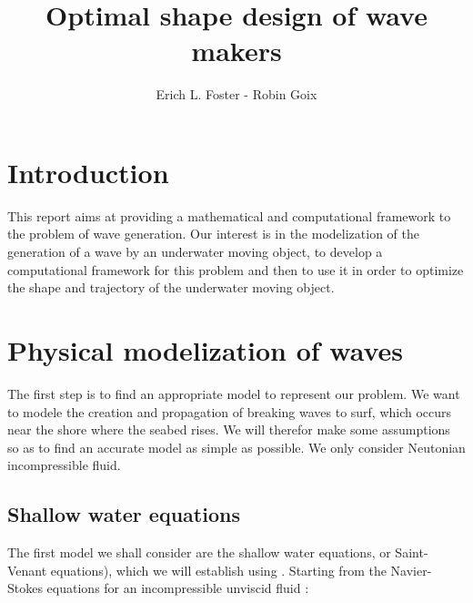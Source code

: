 \documentclass[11pt,a4paper]{article}
\author{Erich L. Foster - Robin Goix}
\title{Optimal shape design of wave makers}
\begin{document}
\maketitle

\tableofcontents
{}
\pagebreak
\section*{Introduction}
This report aims at providing a mathematical and computational framework to the problem of wave generation. Our interest is in the modelization of the generation of a wave by an underwater moving object, to develop a computational framework for this problem and then to use it in order to optimize the shape and trajectory of the underwater moving object.

\pagebreak
\section{Physical modelization of waves}
The first step is to find an appropriate model to represent our problem. 
We want to modele the creation and propagation of breaking waves to surf, which occurs near the shore where the seabed rises. We will therefor make some assumptions so as to find an accurate model as simple as possible. We only consider Neutonian incompressible fluid.

\subsection{Shallow water equations}

The first model we shall consider are the shallow water equations, or Saint-Venant equations), which we will establish using \cite{JMC2013}.
Starting from the Navier-Stokes equations for an incompressible unviscid fluid : 
\end{document}
